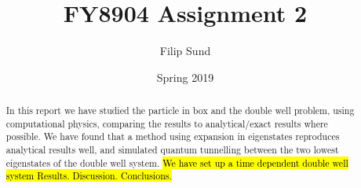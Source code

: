 \documentclass[a4paper]{article}
\title{FY8904 Assignment 2}
\date{Spring 2019}
\author{Filip Sund}
\newcommand{\cpp}{\texttt{C++}}
\newcommand{\cppeleven}{\texttt{C++11}}
\begin{document}
\maketitle

\begin{abstract}
    In this report we have studied the particle in box and the double well problem, using computational physics, comparing the results to analytical/exact results where possible. We have found that a method using expansion in eigenstates reproduces analytical results well, and simulated quantum tunnelling between the two lowest eigenstates of the double well system. \hl{We have set up a time dependent double well system  Results. Discussion. Conclusions.}
\end{abstract}

\end{document}
